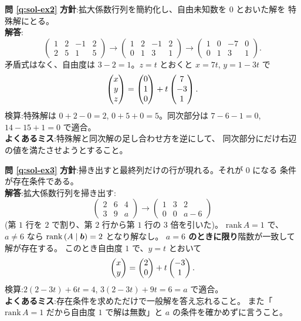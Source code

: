 \bigskip
\noindent\textbf{問 \ref{q:sol-ex2}}\quad
\textbf{方針}:拡大係数行列を簡約化し、自由未知数を $0$ とおいた解を
特殊解にとる。\\
\textbf{解答}:
\[
\left(\begin{array}{ccc|c} 1 & 2 & -1 & 2 \\ 2 & 5 & 1 & 5 \end{array}\right)
\longrightarrow
\left(\begin{array}{ccc|c} 1 & 2 & -1 & 2 \\ 0 & 1 & 3 & 1 \end{array}\right)
\longrightarrow
\left(\begin{array}{ccc|c} 1 & 0 & -7 & 0 \\ 0 & 1 & 3 & 1 \end{array}\right).
\]
矛盾式はなく、自由度は $3 - 2 = 1$。$z = t$ とおくと
$x = 7t$, $y = 1 - 3t$ で
\[
\begin{pmatrix}x \\ y \\ z\end{pmatrix} = \begin{pmatrix}0 \\ 1 \\ 0\end{pmatrix} + t\begin{pmatrix}7 \\ -3 \\ 1\end{pmatrix}.
\]
検算:特殊解は $0 + 2 - 0 = 2$, $0 + 5 + 0 = 5$。同次部分は
$7 - 6 - 1 = 0$, $14 - 15 + 1 = 0$ で適合。\\
\textbf{よくあるミス}:特殊解と同次解の足し合わせ方を逆にして、
同次部分にだけ右辺の値を満たさせようとすること。

\bigskip
\noindent\textbf{問 \ref{q:sol-ex3}}\quad
\textbf{方針}:掃き出すと最終列だけの行が現れる。それが $0$ になる
条件が存在条件である。\\
\textbf{解答}:拡大係数行列を掃き出す:
\[
\left(\begin{array}{cc|c} 2 & 6 & 4 \\ 3 & 9 & a \end{array}\right)
\longrightarrow
\left(\begin{array}{cc|c} 1 & 3 & 2 \\ 0 & 0 & a - 6 \end{array}\right)
\]
(第 $1$ 行を $2$ で割り、第 $2$ 行から第 $1$ 行の $3$ 倍を引いた)。
$\mathrm{rank}\,A = 1$ で、$a \neq 6$ なら
$\mathrm{rank}\,(A \mid \bm{b}) = 2$ となり解なし。
\textbf{$a = 6$ のときに限り}階数が一致して解が存在する。
このとき自由度 $1$ で、$y = t$ とおいて
\[
\begin{pmatrix}x \\ y\end{pmatrix} = \begin{pmatrix}2 \\ 0\end{pmatrix} + t\begin{pmatrix}-3 \\ 1\end{pmatrix}.
\]
検算:$2(2 - 3t) + 6t = 4$, $3(2 - 3t) + 9t = 6 = a$ で適合。\\
\textbf{よくあるミス}:存在条件を求めただけで一般解を答え忘れること。
また「$\mathrm{rank}\,A = 1$ だから自由度 $1$ で解は無数」と
$a$ の条件を確かめずに言うこと。

